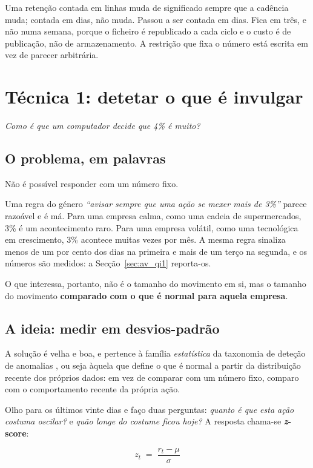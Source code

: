 Uma retenção contada em linhas muda de significado sempre que a cadência muda; contada em dias, não
muda. Passou a ser contada em dias. Fica em três, e não numa semana, porque o ficheiro é
republicado a cada ciclo e o custo é de publicação, não de armazenamento. A restrição que fixa o
número está escrita em vez de parecer arbitrária.

\section{Técnica 1: detetar o que é invulgar}
\label{sec:met_zscore}

\emph{Como é que um computador decide que 4\% é muito?}

\subsection{O problema, em palavras}

Não é possível responder com um número fixo.

Uma regra do género \emph{``avisar sempre que uma ação se mexer mais de 3\%''} parece razoável e é
má. Para uma empresa calma, como uma cadeia de supermercados, 3\% é um acontecimento raro. Para uma
empresa volátil, como uma tecnológica em crescimento, 3\% acontece muitas vezes por mês. A mesma
regra sinaliza menos de um por cento dos dias na primeira e mais de um terço na segunda, e os
números são medidos: a Secção~\ref{sec:av_qi1} reporta-os.

O que interessa, portanto, não é o tamanho do movimento em si, mas o tamanho do movimento
\textbf{comparado com o que é normal para aquela empresa}.

\subsection{A ideia: medir em desvios-padrão}

A solução é velha e boa, e pertence à família \emph{estatística} da taxonomia de deteção de anomalias
\autocite{chandola2009anomaly}, ou seja àquela que define o que é normal a partir da distribuição
recente dos próprios dados: em vez de comparar com um número fixo, comparo com o comportamento
recente da própria ação.

Olho para os últimos vinte dias e faço duas perguntas: \emph{quanto é que esta ação costuma oscilar?}
e \emph{quão longe do costume ficou hoje?} A resposta chama-se \textbf{\emph{z}-score}:

\begin{equation}
  z_t \;=\; \frac{r_t - \mu}{\sigma}
  \label{eq:zscore}
\end{equation}

